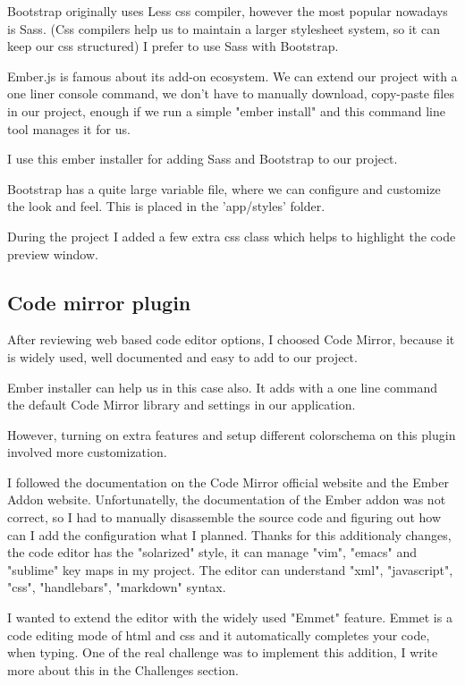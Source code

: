 \documentclass[12pt, a4paper, oneside, openright, medskipamount]{report}
\begin{document}
Bootstrap originally uses Less\cite{less} css compiler, however the most popular nowadays is Sass\cite{sass}. (Css compilers help us to maintain a larger stylesheet system, so it can keep our css structured) I prefer to use Sass with Bootstrap.

Ember.js is famous about its add-on ecosystem. We can extend our project with a one liner console command, we don't have to manually download, copy-paste files in our project, enough if we run a simple "ember install" and this command line tool manages it for us.

I use this ember installer for adding Sass and Bootstrap to our project.

Bootstrap has a quite large variable file, where we can configure and customize the look and feel. This is placed in the 'app/styles' folder.

During the project I added a few extra css class which helps to highlight the code preview window.

\subsection{Code mirror plugin}

After reviewing web based code editor options, I choosed Code Mirror, because it is widely used, well documented and easy to add to our project.

Ember installer can help us in this case also. It adds with a one line command the default Code Mirror library and settings in our application.

However, turning on extra features and setup different colorschema on this plugin involved more customization.

I followed the documentation on the Code Mirror official website and the Ember Addon website. Unfortunatelly, the documentation of the Ember addon was not correct, so I had to manually disassemble the source code and figuring out how can I add the configuration what I planned. Thanks for this additionaly changes, the code editor has the "solarized" style, it can manage "vim", "emacs" and "sublime" key maps in my project. The editor can understand "xml", "javascript", "css", "handlebars", "markdown" syntax.

I wanted to extend the editor with the widely used "Emmet" feature. Emmet is a code editing mode of html and css and it automatically completes your code, when typing. One of the real challenge was to implement this addition, I write more about this in the Challenges section.
\end{document}
